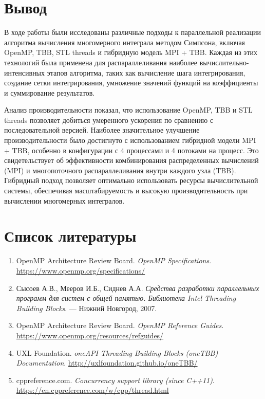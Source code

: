 \documentclass[12pt]{article}
\begin{document}
\section{Вывод}

\hspace*{1.35em}В ходе работы были исследованы различные подходы к параллельной реализации алгоритма вычисления многомерного интеграла методом Симпсона, включая OpenMP, TBB, STL threads и гибридную модель MPI + TBB. Каждая из этих технологий была применена для распараллеливания наиболее вычислительно-интенсивных этапов алгоритма, таких как вычисление шага интегрирования, создание сетки интегрирования, умножение значений функций на коэффициенты и суммирование результатов.

Анализ производительности показал, что использование OpenMP, TBB и STL threads позволяет добиться умеренного ускорения по сравнению с последовательной версией. Наиболее значительное улучшение производительности было достигнуто с использованием гибридной модели MPI + TBB, особенно в конфигурации с 4 процессами и 4 потоками на процесс. Это свидетельствует об эффективности комбинирования распределенных вычислений (MPI) и многопоточного распараллеливания внутри каждого узла (TBB). Гибридный подход позволяет оптимально использовать ресурсы вычислительной системы, обеспечивая масштабируемость и высокую производительность при вычислении многомерных интегралов.

\section{Список литературы}

\begin{enumerate}
    \item OpenMP Architecture Review Board. \textit{OpenMP Specifications}. \url{https://www.openmp.org/specifications/}
    \item Сысоев А.В., Мееров И.Б., Сиднев А.А. \textit{Средства разработки параллельных программ для систем с общей памятью. Библиотека Intel Threading Building Blocks}. — Нижний Новгород, 2007.
    \item OpenMP Architecture Review Board. \textit{OpenMP Reference Guides}. \url{https://www.openmp.org/resources/refguides/}
    \item UXL Foundation. \textit{oneAPI Threading Building Blocks (oneTBB) Documentation}. \url{http://uxlfoundation.github.io/oneTBB/}
    \item cppreference.com. \textit{Concurrency support library (since C++11)}. \url{https://en.cppreference.com/w/cpp/thread.html}
\end{enumerate}
\newpage
\end{document}
